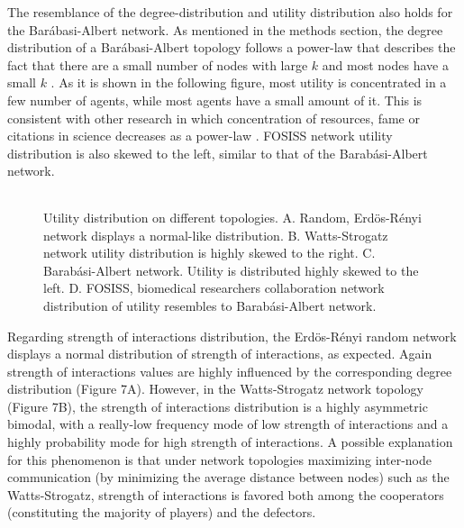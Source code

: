 \documentclass{bmcart}
\def\texttt{[image: ]}
\begin{document}
The resemblance of the degree-distribution and utility distribution also holds
for the Bar\'abasi-Albert network. As mentioned in the methods section, the
degree distribution of a Bar\'abasi-Albert topology follows a power-law that
describes the fact that there are a small number of nodes with large $k$ and most
nodes have a small $k$ \cite{BarabasiAlbert:99}. As it is shown in the following
figure, most utility is concentrated in a few number of agents, while most
agents have a small amount of it. This is consistent with other research in
which concentration of resources, fame or citations in science decreases as a
power-law \cite{Simon:55,Price:1965,Merton:1968}. FOSISS network utility
distribution is also skewed to the left, similar to that of the
Barab\'asi-Albert network. \\ 


\begin{figure} [h!]
\centering
\begin{tabular}{cc}

\end{tabular}
\caption{Utility distribution on different topologies. A. Random,
  Erd\"{o}s-R\'enyi network displays a normal-like
  distribution. B. Watts-Strogatz network utility distribution is highly skewed
  to the right. C. Barab\'asi-Albert network. Utility is distributed highly
  skewed to the left. D. FOSISS, biomedical researchers collaboration network
  distribution of utility resembles to Barab\'asi-Albert
  network.}\label{histo_fitness} 
\end{figure}


Regarding strength of interactions distribution, the Erd\"{o}s-R\'enyi random
network displays a normal distribution of strength of interactions, as
expected. Again strength of interactions values are highly influenced by the
corresponding degree distribution (Figure 7A). However, in the Watts-Strogatz
network topology (Figure 7B), the strength of interactions distribution is a
highly asymmetric bimodal, with a really-low frequency mode of low strength of
interactions and a highly probability mode for high strength of interactions. A
possible explanation for this phenomenon is that under network topologies
maximizing inter-node communication (by minimizing the average distance between
nodes) such as the Watts-Strogatz, strength of interactions is favored both
among the cooperators (constituting the majority of players) and the
defectors. \\ 
\end{document}
